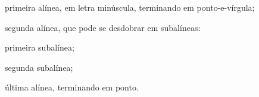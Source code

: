 \begin{alineas}
  \item primeira alínea, em letra minúscula, terminando em ponto-e-vírgula;
  \item segunda alínea, que pode se desdobrar em subalíneas:
  \begin{subalineas}
    \item primeira subalínea;
    \item segunda subalínea;
  \end{subalineas}
  \item última alínea, terminando em ponto.
\end{alineas}
